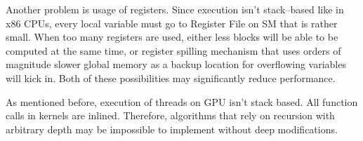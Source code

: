 Another problem is usage of registers. Since execution isn't stack--based like
in x86 CPUs, every local variable must go to Register File on SM that is rather
small. When too many registers are used, either less blocks will be able to
be computed at the same time, or register spilling mechanism that uses orders
of magnitude slower global memory as a backup location for overflowing variables
will kick in. Both of these possibilities may significantly reduce performance.

As mentioned before, execution of threads on GPU isn't stack based. All function
calls in kernels are inlined. Therefore, algorithms that rely on recursion with
arbitrary depth may be impossible to implement without deep modifications.

